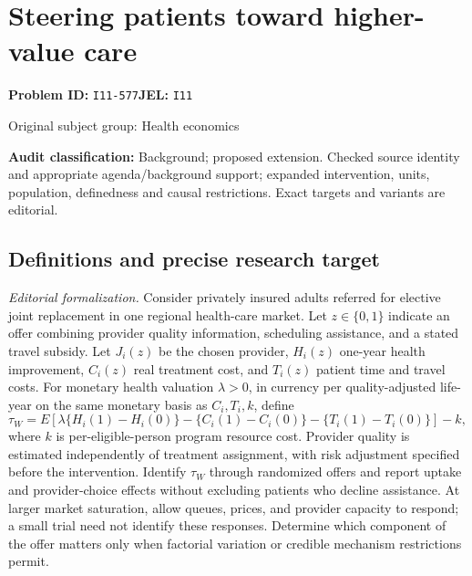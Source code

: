 \documentclass[11pt,a4paper]{article}
\begin{document}
\section*{Steering patients toward higher-value care}
\textbf{Problem ID:} \texttt{I11-577}\quad \textbf{JEL:} \texttt{I11}\par
\label{problem:OP-0444}
{\sffamily\small\color{muted}Original subject group: Health economics\par}
\label{definitions:problem:30007726}
\textbf{Audit classification:} Background; proposed extension. Checked source identity and appropriate agenda/background support; expanded intervention, units, population, definedness and causal restrictions. Exact targets and variants are editorial.
\subsection*{Definitions and precise research target}
\textit{Editorial formalization.} Consider privately insured adults referred for elective joint replacement in one regional health-care market. Let \(z\in\{0,1\}\) indicate an offer combining provider quality information, scheduling assistance, and a stated travel subsidy. Let \(J_i(z)\) be the chosen provider, \(H_i(z)\) one-year health improvement, \(C_i(z)\) real treatment cost, and \(T_i(z)\) patient time and travel costs. For monetary health valuation \(\lambda>0\), in currency per quality-adjusted life-year on the same monetary basis as \(C_i,T_i,k\), define
\[\tau_W=E[\lambda\{H_i(1)-H_i(0)\}-\{C_i(1)-C_i(0)\}-\{T_i(1)-T_i(0)\}]-k,\]
where \(k\) is per-eligible-person program resource cost. Provider quality is estimated independently of treatment assignment, with risk adjustment specified before the intervention. Identify \(\tau_W\) through randomized offers and report uptake and provider-choice effects without excluding patients who decline assistance. At larger market saturation, allow queues, prices, and provider capacity to respond; a small trial need not identify these responses. Determine which component of the offer matters only when factorial variation or credible mechanism restrictions permit.
\end{document}
